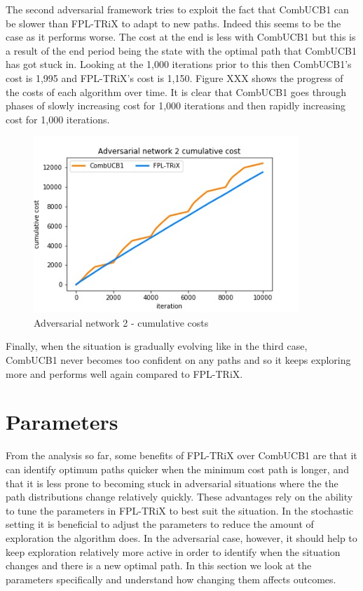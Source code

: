 The second adversarial framework tries to exploit the fact that CombUCB1 can be slower than FPL-TRiX to adapt to new paths. Indeed this seems to be the case as it performs worse. The cost at the end is less with CombUCB1 but this is a result of the end period being the state with the optimal path that CombUCB1 has got stuck in. Looking at the 1,000 iterations prior to this then CombUCB1's cost is 1,995 and FPL-TRiX's cost is 1,150. Figure XXX shows the progress of the costs of each algorithm over time. It is clear that CombUCB1 goes through phases of slowly increasing cost for 1,000 iterations and then rapidly increasing cost for 1,000 iterations.\\

\begin{figure}[h!]%
  \centering
  \includegraphics[width=10cm]{../plots/advers_net2_cumul_costs.jpg}
  \caption{Adversarial network 2 - cumulative costs}
  \label{}
\end{figure}

Finally, when the situation is gradually evolving like in the third case, CombUCB1 never becomes too confident on any paths and so it keeps exploring more and performs well again compared to FPL-TRiX.\\


\pagebreak


\section{Parameters}

From the analysis so far, some benefits of FPL-TRiX over CombUCB1 are that it can identify optimum paths quicker when the minimum cost path is longer, and that it is less prone to becoming stuck in adversarial situations where the the path distributions change relatively quickly. These advantages rely on the ability to tune the parameters in FPL-TRiX to best suit the situation. In the stochastic setting it is beneficial to adjust the parameters to reduce the amount of exploration the algorithm does. In the adversarial case, however, it should help to keep exploration relatively more active in order to identify when the situation changes and there is a new optimal path. In this section we look at the parameters specifically and understand how changing them affects outcomes.\\

